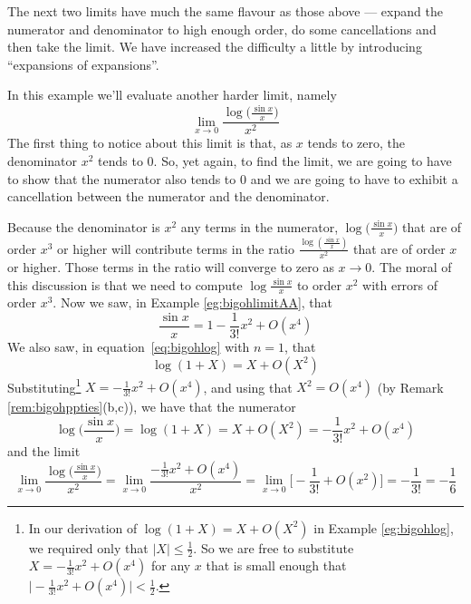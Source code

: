 The next two limits have much the same flavour as those above --- expand
the numerator and denominator to high enough order, do some cancellations
and then take the limit. We have increased the difficulty a little by
introducing ``expansions of expansions''.
\begin{eg}\label{eg:bigohlimitC}
In this example we'll evaluate another harder limit, namely
\begin{equation*}
\lim_{x\rightarrow 0}\frac{\log\big(\frac{\sin x}{x}\big)}{x^2}
\end{equation*}
The first thing to notice about this limit is that, as $x$ tends to zero,
the denominator $x^2$ tends to $0$.
So, yet again, to find the limit, we are going to have
to show that the numerator also tends to $0$ and we are going to have
to exhibit a cancellation between the numerator and the denominator.

Because the denominator is $x^2$ any terms in the numerator,
$\log\big(\frac{\sin x}{x}\big)$ that are of order $x^3$ or higher
will contribute terms in the ratio $\frac{\log(\frac{\sin x}{x})}{x^2}$
that are of order $x$ or higher. Those terms in the ratio will converge to
zero as $x\rightarrow 0$. The moral of this discussion is that we need
to compute $\log\frac{\sin x}{x}$ to order $x^2$ with errors of
order $x^3$. Now we saw, in Example \ref{eg:bigohlimitAA}, that
\begin{equation*}
\frac{\sin x}{x}=1-\frac{1}{3!}x^2+O(x^4)
\end{equation*}
We also saw, in equation~\eqref{eq:bigohlog} with $n=1$, that
\begin{equation*}
\log(1+X) = X +O(X^2)
\end{equation*}
Substituting\footnote{In our derivation of $\log(1+X) = X +O(X^2)$
in Example \ref{eg:bigohlog}, we required only that $|X|\le\frac{1}{2}$.
So we are free to substitute $X= -\frac{1}{3!}x^2+O(x^4)$ for any $x$ that is
small enough that $\big|-\frac{1}{3!}x^2+O(x^4)\big|<\frac{1}{2}$.}
$X= -\frac{1}{3!}x^2+O(x^4)$, and using that
$X^2=O(x^4)$ (by Remark \ref{rem:bigohppties}(b,c)), we have
that the numerator
\begin{equation*}
\log\Big(\frac{\sin x}{x}\Big)
=\log(1+X)
= X +O(X^2)
=-\frac{1}{3!}x^2+O(x^4)
\end{equation*}
and the limit
\begin{equation*}
\lim_{x\rightarrow 0}\frac{\log\big(\frac{\sin x}{x}\big)}{x^2}
=\lim_{x\rightarrow 0}\frac{-\frac{1}{3!}x^2+O(x^4)}{x^2}
=\lim_{x\rightarrow 0}\Big[-\frac{1}{3!}+O(x^2)\Big]
=-\frac{1}{3!}
=-\frac{1}{6}
\end{equation*}
\end{eg}


